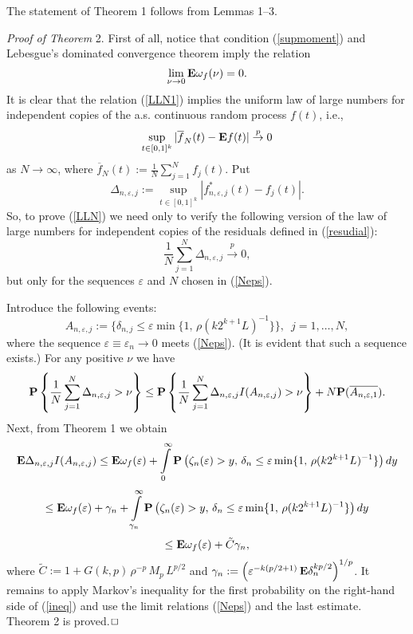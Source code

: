 \documentclass[12pt]{article}
\theoremstyle{remark}
\begin{document}
The statement of Theorem 1 follows from Lemmas 1--3.

{\it Proof of Theorem} 2. First of all, notice that condition (\ref{supmoment}) and  Lebesgue's dominated convergence theorem imply
the relation
\begin{equation}\label{LLN1}
\lim_{\nu\to 0}{\bf E}\omega_f(\nu)=0.
\end{equation}
It is clear that the relation (\ref{LLN1}) implies  the uniform law of large numbers  for
independent copies of the a.s. continuous random process $f(t)$, i.e.,
$$\sup\limits_{t\in [0,1]^k}|\overline{f}_{N}(t)-{\bf E}f(t)|\stackrel{p}\to 0
$$
as $N\to \infty$, where $\overline f_{N}(t):=\frac{1}{N}\sum\limits_{j=1}^Nf_j(t)$.
Put
\begin{equation}\label{resudial}
\Delta_{n,\varepsilon,j}:=\sup_{t\in [0,1]^k}| f^*_{n,\varepsilon,j}(t)-f_j(t)|.
\end{equation}
So, to prove (\ref{LLN}) we need only  to verify the following version of the law of large numbers
for independent copies of the residuals defined in (\ref{resudial}):
$$
\frac{1}{N}\sum_{j=1}^N\Delta_{n,\varepsilon,j}\stackrel{p}\to 0,
$$
but only for the sequences $\varepsilon$ and $N$ chosen in (\ref{Neps}).

Introduce the following events:
$$A_{n,\varepsilon,j}:=\{\delta_{n,j}\le\varepsilon\min\{1,\, \rho(k2^{k+1} L)^{-1}\}\},\,\,\,j=1,\ldots,N,
$$
where the sequence $\varepsilon\equiv \varepsilon_n\to 0$ meets (\ref{Neps}). (It is evident that such a sequence exists.)
For any positive $\nu$ we have
\begin{equation}\label{ineq}
{\bf P}\left \{\frac{1}{N}\sum_{j=1}^N\Delta_{n,\varepsilon,j}>\nu\right\}\le {\bf P}\left \{\frac{1}{N}
\sum_{j=1}^N\Delta_{n,\varepsilon,j}I(A_{n,\varepsilon,j})>\nu\right\}+N{\bf P}(\overline{A_{n,\varepsilon,1}}).
\end{equation}
Next, from Theorem 1 we obtain
$${\bf E}\Delta_{n,\varepsilon,j}I(A_{n,\varepsilon,j})\le {\bf E}\omega_f(\varepsilon)+
\int\limits_0^{\infty}{\bf P}\left( \zeta_n(\varepsilon)>y,\, \delta_n\le\varepsilon\min\{1,\, \rho(k2^{k+1} L)^{-1}\}\right)dy
$$
$$\le {\bf E}\omega_f(\varepsilon)+\gamma_n +
\int\limits_{\gamma_n}^{\infty}{\bf P}\left( \zeta_n(\varepsilon)>y,\, \delta_n\le\varepsilon\min\{1,\, \rho(k2^{k+1} L)^{-1}\}\right)dy
$$
$$\le {\bf E}\omega_f(\varepsilon)+\tilde C \gamma_n,
$$
where $\tilde C:=1+G(k,p)\, \rho^{-p}\, M_p\, L^{p/2}$ and $\gamma_n:=\left(\varepsilon^{-k(p/2+1)}\,{\bf E}\delta_n^{kp/2}\right)^{1/p}$. It remains to apply Markov's inequality for the first probability on the right-hand side of (\ref{ineq})
and use the limit relations (\ref{Neps}) and the last estimate. Theorem 2 is proved.$\hfill\Box$
\end{document}
